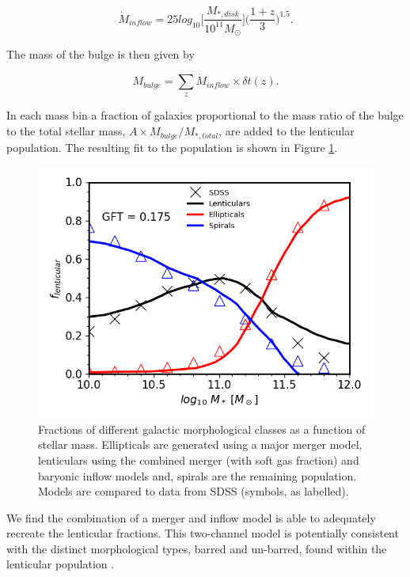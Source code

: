 \begin{equation}
    \label{eqn:DiskInflow}
    \dot{M}_{inflow} = 25 log_{10}\Big[\frac{M_{*,disk}}{10^{11}M_{\odot}}\Big]\Big(\frac{1 + z}{3}\Big)^{1.5}.
\end{equation}

The mass of the bulge is then given by

\begin{equation}
    M_{bulge} = \sum_z \dot{M}_{inflow} \times \delta t(z).
\end{equation}

In each mass bin a fraction of galaxies proportional to the mass ratio of the bulge to the total stellar mass, $A \times M_{bulge} / M_{*, total}$, are added to the lenticular population. The resulting fit to the population is shown in Figure \ref{fig:All_Morphologies}.

\begin{figure}
  \includegraphics[width=\linewidth]{Figures/Chapter5/Bulge_Growth_Final_All_Morph.png}
    \caption{Fractions of different galactic morphological classes as a function of stellar mass. Ellipticals are generated using a major merger model, lenticulars using the combined merger (with soft gas fraction) and baryonic inflow models and, spirals are the remaining population. Models are compared to data from SDSS (symbols, as labelled).}
    \label{fig:All_Morphologies}
\end{figure}

We find the combination of a merger and inflow model is able to adequately recreate the lenticular fractions. This two-channel model is potentially consistent with the distinct morphological types, barred and un-barred, found within the lenticular population \cite{Laurikainen2005MulticomponentGalaxies, VanDenBergh2012LuminositiesGalaxies}.

